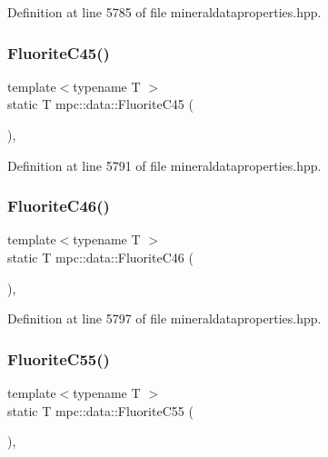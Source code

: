 Definition at line 5785 of file mineraldataproperties.\+hpp.

\mbox{\label{namespacempc_1_1data_a04bbdc764d42ae11e31072dc709035f2}} 
\subsubsection{\texorpdfstring{Fluorite\+C45()}{FluoriteC45()}}
{\footnotesize\ttfamily template$<$typename T $>$ \\
static T mpc\+::data\+::\+Fluorite\+C45 (\begin{DoxyParamCaption}{ }\end{DoxyParamCaption})\hspace{0.3cm}{\ttfamily [inline]}, {\ttfamily [static]}}



Definition at line 5791 of file mineraldataproperties.\+hpp.

\mbox{\label{namespacempc_1_1data_ab74d5e645196831e463c9ca58081c9da}} 
\subsubsection{\texorpdfstring{Fluorite\+C46()}{FluoriteC46()}}
{\footnotesize\ttfamily template$<$typename T $>$ \\
static T mpc\+::data\+::\+Fluorite\+C46 (\begin{DoxyParamCaption}{ }\end{DoxyParamCaption})\hspace{0.3cm}{\ttfamily [inline]}, {\ttfamily [static]}}



Definition at line 5797 of file mineraldataproperties.\+hpp.

\mbox{\label{namespacempc_1_1data_a6ce2dad81f20bcd46967fa289d516d29}} 
\subsubsection{\texorpdfstring{Fluorite\+C55()}{FluoriteC55()}}
{\footnotesize\ttfamily template$<$typename T $>$ \\
static T mpc\+::data\+::\+Fluorite\+C55 (\begin{DoxyParamCaption}{ }\end{DoxyParamCaption})\hspace{0.3cm}{\ttfamily [inline]}, {\ttfamily [static]}}




